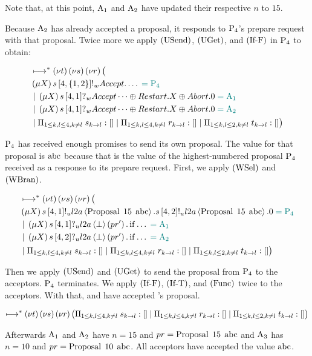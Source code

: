 Note that, at this point, $\Acceptor{1}$ and $\Acceptor{2}$ have updated their respective $n$ to $15$.

Because $\Acceptor{2}$ has already accepted a proposal, it responds to $\Proposer{4}$'s prepare request with that proposal.
Twice more we apply $\RUsend$, $\RUget$, and $\RIfF$ in $\Proposer{4}$ to obtain:

\begin{align*}
&\mapstostar \NuChannels \big (\\
&\Mu{X} \SendWeaklyP{s}{4}{\Curly{1,2}}{\Accept}{\dots} \comment{= \Proposer{4}}\\
&\Or \Mu{X} \ReceiveWeaklyP{s}{4}{1}{\BeginPaCont} \comment{= \Acceptor{1}}\\
&\Or \Mu{X} \ReceiveWeaklyP{s}{4}{1}{\BeginPaCont} \comment{= \Acceptor{2}}\\
&\Or \InnerSessionQueues{s}
\Or \InnerSessionQueues{r}
\Or \OuterSessionQueues
\big )
\end{align*}

$\Proposer{4}$ has received enough promises to send its own proposal.
The value for that proposal is $\ABC$ because that is the value of the highest-numbered proposal $\Proposer{4}$ received as a response to its prepare request.
First, we apply $\RWsel$ and $\RWbran$.

\begin{align*}
&\mapstostar \NuChannels \big (\\
&\Mu{X} \SendUnreliableP{s}{4}{1}{\LTwoA}{\ProposalC{15}{\ABC}}.
\SendUnreliableP{s}{4}{2}{\LTwoA}{\ProposalC{15}{\ABC}}.\End \comment{= \Proposer{4}}\\
&\Or \Mu{X} \ReceiveUnreliableP{s}{4}{1}{\LTwoA}{\bot}{pr'}.\If{\dots}\comment{= \Acceptor{1}}\\
&\Or \Mu{X} \ReceiveUnreliableP{s}{4}{2}{\LTwoA}{\bot}{pr'}.\If{\dots}\comment{= \Acceptor{2}}\\
&\Or \InnerSessionQueues{s}
\Or \InnerSessionQueues{r}
\Or \OuterSessionQueues
\big )
\end{align*}

Then we apply $\RUsend$ and $\RUget$ to send the proposal from $\Proposer{4}$ to the acceptors.
$\Proposer{4}$ terminates.
We apply $\RIfF$, $\RIfT$, and $\RSideEffect$ twice to the acceptors.
With that,  and  have accepted 's proposal.

\[\mapstostar
\NuChannels \big (\InnerSessionQueues{s}
\Or \InnerSessionQueues{r}
\Or \OuterSessionQueues
\big )\]

Afterwards $\Acceptor{1}$ and $\Acceptor{2}$ have $n = 15$ and $pr = \ProposalC{15}{\ABC}$ and $\Acceptor{3}$ has $n = 10$ and $pr = \ProposalC{10}{\ABC}$.
All acceptors have accepted the value $\ABC$.
